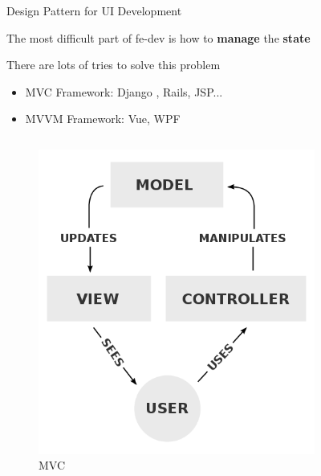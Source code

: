 \begin{frame}{Design Pattern for UI Development}

    The most difficult part of fe-dev is how to \textbf{manage} the \textbf{state}

    \pause
    There are lots of tries to solve  this problem

    \begin{itemize}
        \pause[2]
        \item MVC Framework: Django , Rails, JSP...
        \pause[3]
        \item MVVM Framework: Vue, WPF
    \end{itemize}

    \begin{columns}
        \pause[2]
        \begin{column}{.3\textwidth}
            \begin{figure}
                \includegraphics[width=\textwidth]{assets/MVC.png}
                \caption{MVC}
            \end{figure}
        \end{column}
    \pause[3]
        \begin{column}{.7\textwidth}
            \begin{figure}

\end{figure}
\end{column}
\end{columns}
\end{frame}

